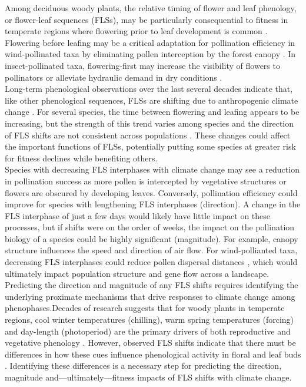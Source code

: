 \documentclass[11pt]{article}\usepackage[]{graphicx}\usepackage[]{color}
\begin{document}
\noindent Among deciduous woody plants, the relative timing of flower and leaf phenology, or flower-leaf sequences (FLSs), may be particularly consequential to fitness in temperate regions where flowering prior to leaf development is common \citep{Rathcke_1985,Gougherty2018}. Flowering before leafing may be a critical adaptation for pollination efficiency in wind-pollinated taxa by eliminating pollen interception by the forest canopy \citep{Whitehead1969}. In insect-pollinated taxa, flowering-first may increase the visibility of flowers to pollinators \citep{Janzen1967,Savage2019} or alleviate hydraulic demand in dry conditions \citep{Gougherty2018, Franklin2016}.\\

\noindent Long-term phenological observations over the last several decades indicate that, like other phenological sequences, FLSs are shifting due to anthropogenic climate change \citep{Buonaiuto2020}. For several species, the time between flowering and leafing appears to be increasing, but the strength of this trend varies among species and the direction of FLS shifts are not consistent across populations \citep{Buonaiuto2020}. These changes could affect the important functions of FLSs, potentially putting some species at greater risk for fitness declines while benefiting others.\\

\noindent Species with decreasing FLS interphases with climate change may see a reduction in pollination success as more pollen is intercepted by vegetative structures or flowers are obscured by developing leaves. Conversely, pollination efficiency could improve for species with lengthening FLS interphases (direction). A change in the FLS interphase of just a few days would likely have little impact on these processes, but if shifts were on the order of weeks, the impact on the pollination biology of a species could be highly significant (magnitude). For example, canopy structure influences the speed and direction of air flow\citep{Niklas1985, Jackson:1999aa}. For wind-pollianted taxa, decreasing FLS interphases could reduce pollen dispersal distances \citep{Milleron2012}, which would ultimately impact population structure and gene flow across a landscape.\\

\noindent Predicting the direction and magnitude of any FLS shifts requires identifying the underlying proximate mechanisms that drive responses to climate change among phenophases.Decades of research suggests that for woody plants in temperate regions, cool winter temperatures (chilling), warm spring temperatures (forcing) and day-length (photoperiod) are the primary drivers of both reproductive and vegetative phenology \citep{Forrest2010,Flynn2018}. However, observed FLS shifts indicate that there must be differences in how these cues influence phenological activity in floral and leaf buds \citep{Buonaiuto2020}.  Identifying these differences is a necessary step for predicting the direction, magnitude and---ultimately---fitness impacts of FLS shifts with climate change.\\ 
\end{document}
